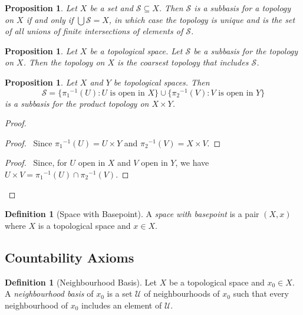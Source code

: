 \documentclass{book}
\let\qed\relax
\newtheorem{prop}[ax]{Proposition}
\theoremstyle{definition}
\newtheorem{df}[ax]{Definition}
\newcommand{\inv}[1]{\ensuremath{{#1}^{-1}}}
\begin{document}
\begin{prop}
Let $X$ be a set and $\mathcal{S} \subseteq X$. Then $\mathcal{S}$ is a subbasis for a topology on $X$ if and only if $\bigcup \mathcal{S} = X$, in which case the topology is unique and is the set of all unions of finite intersections of elements of $\mathcal{S}$.
\end{prop}

\begin{prop}
Let $X$ be a topological space.
Let $\mathcal{S}$ be a subbasis for the topology on $X$.
Then the topology on $X$ is the coarsest topology that includes $\mathcal{S}$.
\end{prop}


\begin{prop}
Let $X$ and $Y$ be topological spaces. Then
\[ \mathcal{S} = \{ \inv{\pi_1}(U) : U \text{ is open in } X \} \cup \{ \inv{\pi_2}(V) : V \text{ is open in } Y \} \]
is a subbasis for the product topology on $X \times Y$.
\end{prop}

\begin{proof}
\pf
{}
\begin{proof}
	\pf\ Since $\inv{\pi_1}(U) = U \times Y$ and $\inv{\pi_2}(V) = X \times V$.
\end{proof}
\begin{proof}
	\pf\ Since, for $U$ open in $X$ and $V$ open in $Y$, we have $U \times V = \inv{\pi_1}(U) \cap \inv{\pi_2}(V)$.
\end{proof}
\qed
\end{proof}

\begin{df}[Space with Basepoint]
A \emph{space with basepoint} is a pair $(X,x)$ where $X$ is a topological space and $x \in X$.
\end{df}

\subsection{Countability Axioms}

\begin{df}[Neighbourhood Basis]
Let $X$ be a topological space and $x_0 \in X$. A \emph{neighbourhood basis} of $x_0$ is a set $\mathcal{U}$ of neighbourhoods of $x_0$ such that every neighbourhood of $x_0$ includes an element of $\mathcal{U}$.
\end{df}
\end{document}
